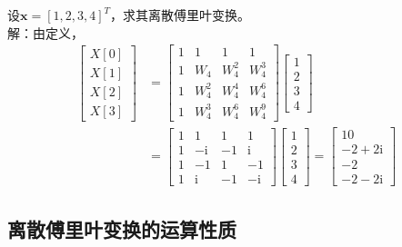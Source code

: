 \begin{example}
    设$\mathbf{x}=[1,2,3,4]^T$，求其离散傅里叶变换。\\
    解：由定义，
    \begin{align*}
        \begin{bmatrix}
            X[0]  \\
            X[1]  \\
            X[2]  \\
            X[3]
        \end{bmatrix}&=\begin{bmatrix}1 & 1 & 1 & 1 \\
        1 & W_4 & W_4^{2} & W_4^{3} \\
        1 & W_4^{2} & W_4^{4} & W_4^{6} \\
        1 & W_4^{3} & W_4^{6} & W_4^{9}
        \end{bmatrix}\begin{bmatrix}
            1  \\
            2  \\
            3  \\
            4
        \end{bmatrix}\\
        &=\begin{bmatrix}
        1 & 1 & 1 & 1 \\
        1 & -\mathrm{i} & -1 & \mathrm{i} \\
        1 & -1 & 1 & -1 \\
        1 & \mathrm{i} & -1 & -\mathrm{i}
        \end{bmatrix}\begin{bmatrix}
            1  \\
            2  \\
            3  \\
            4
        \end{bmatrix}=\begin{bmatrix}
            10  \\
            -2+2\mathrm{i}  \\
            -2  \\
            -2-2\mathrm{i}
        \end{bmatrix}
    \end{align*}
\end{example}

\subsection{离散傅里叶变换的运算性质}\label{sub:property_of_DFT}

